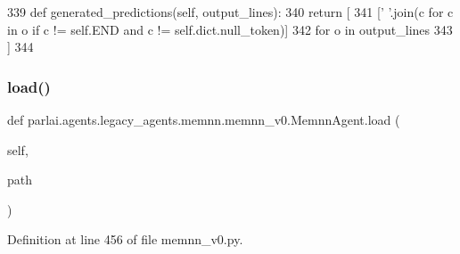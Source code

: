 \begin{DoxyCode}
339     \textcolor{keyword}{def }generated\_predictions(self, output\_lines):
340         \textcolor{keywordflow}{return} [
341             [\textcolor{stringliteral}{' '}.join(c \textcolor{keywordflow}{for} c \textcolor{keywordflow}{in} o \textcolor{keywordflow}{if} c != self.END \textcolor{keywordflow}{and} c != self.dict.null\_token)]
342             \textcolor{keywordflow}{for} o \textcolor{keywordflow}{in} output\_lines
343         ]
344 
\end{DoxyCode}
\mbox{\label{classparlai_1_1agents_1_1legacy__agents_1_1memnn_1_1memnn__v0_1_1MemnnAgent_a43e08459f9552c66ef389b8727b8eff3}} 
\subsubsection{\texorpdfstring{load()}{load()}}
{\footnotesize\ttfamily def parlai.\+agents.\+legacy\+\_\+agents.\+memnn.\+memnn\+\_\+v0.\+Memnn\+Agent.\+load (\begin{DoxyParamCaption}\item[{}]{self,  }\item[{}]{path }\end{DoxyParamCaption})}



Definition at line 456 of file memnn\+\_\+v0.\+py.


